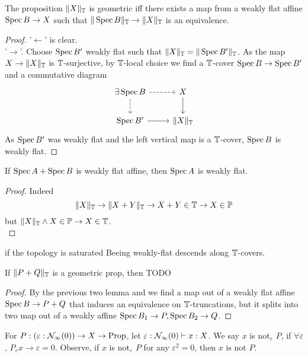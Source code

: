 \documentclass{article}
\begin{document}
\begin{lemma}
	The proposition $\|X\|_{\mathbb{T}}$ is geometric iff there exists a map from a weakly flat affine $\operatorname{Spec} B \to X$ such that $\|\operatorname{Spec} B\|_{\mathbb{T}} \to \|X\|_{\mathbb{T}}$ is an equivalence.
\end{lemma}
\begin{proof}
	'$\leftarrow$' is clear. \\
	'$\rightarrow$'. Choose $\operatorname{Spec} B'$ weakly flat such that $\|X\|_{\mathbb{T}} = \|\operatorname{Spec} B'\|_{\mathbb{T}}$. As the map $X \to \|X\|_{\mathbb{T}}$ is $\mathbb{T}$-surjective, by $\mathbb{T}$-local choice we find a $\mathbb{T}$-cover $\operatorname{Spec} B \to \operatorname{Spec} B'$ and a commutative diagram
	\[\begin{tikzcd}
		{\exists \Spec B} & {X} \\
		{\Spec B'} & {\|X\|_\bT}
		\arrow[dashed, from=1-1, to=1-2]
		\arrow[dashed, from=1-1, to=2-1]
		\arrow[from=1-2, to=2-2]
		\arrow[from=2-1, to=2-2]
	\end{tikzcd}\]
	As $\operatorname{Spec} B'$ was weakly flat and the left vertical map is a $\mathbb{T}$-cover, $\operatorname{Spec} B$ is weakly flat.
\end{proof}
\begin{lemma}[DM]
	If $\operatorname{Spec} A + \operatorname{Spec} B$ is weakly flat affine, then $\operatorname{Spec} A$ is weakly flat. 
\end{lemma}
\begin{proof}
	Indeed
	\[
	\|X\|_{\mathbb{T}} \to \|X + Y\|_{\mathbb{T}} \to X + Y \in \mathbb{T} \to X \in \mathbb{P} 
	\]
	but $\|X\|_{\mathbb{T}} \land X \in \mathbb{P} \to X \in \mathbb{T}$. \\
\end{proof}
\begin{lemma}{\label{lemma:wfdesTCov}}
	if the topology is saturated Beeing weakly-flat descends along $\mathbb{T}$-covers.
\end{lemma}
\begin{lemma}[DM]
	If $\|P + Q \|_{\mathbb{T}}$ is a geometric prop, then TODO %
\end{lemma}
\begin{proof}
	
	By the previous two lemma and we find a map out of a weakly flat affine $\operatorname{Spec} B \to P + Q$ that induces an equivalence on $\mathbb{T}$-truncations, but it splits into two map out of a  weakly affine $\operatorname{Spec} B_1 \to P, \operatorname{Spec} B_2 \to Q$.
\end{proof}
\begin{notation}
	For $P : (\varepsilon : \mathcal{N}_\infty(0)) \to X \to \operatorname{Prop}$, let $\varepsilon : \mathcal{N}_\infty(0) \vdash x : X$. We say $x$ is not$_\varepsilon$ $P$, if $\forall \varepsilon$ , $P_\varepsilon x \to \varepsilon = 0$. Observe, if $x$ is not$_\varepsilon$ $P$ for any $\varepsilon^2 = 0$, then $x$ is not $P$.
\end{notation}
\end{document}
